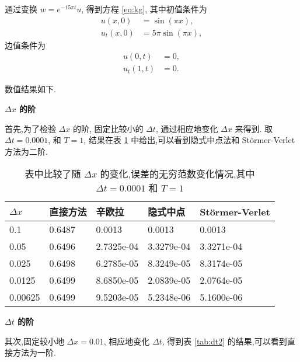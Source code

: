 通过变换 $w=e^{-15\pi t}u$, 得到方程 \eqref{eq:kg}, 其中初值条件为
\begin{equation*}
\begin{aligned}
u(x,0)&=\sin(\pi x),\\
u_t(x,0)&=5\pi \sin(\pi x),
\end{aligned}
\end{equation*}
边值条件为
\begin{equation*}
\begin{aligned}
u(0,t)&=0,\\
u_t(1,t)&=0.
\end{aligned}
\end{equation*}

数值结果如下.

\textbf{$\Delta x$ 的阶}

首先,为了检验 $\Delta x$ 的阶, 固定比较小的 $\Delta
t$, 通过相应地变化 $\Delta x$ 来得到. 取 $\Delta t = 0.0001$, 和 $T
= 1$, 结果在表 \ref{tab:dx2} 中给出,可以看到隐式中点法和 St\"{o}rmer-Verlet 方法为二阶.

\begin{table}[h]
  \centering
\caption{表中比较了随 $\Delta x$ 的变化,误差的无穷范数变化情况,其中 $\Delta t=0.0001$ 和 $T=1$}
\begin{tabularx}{\linewidth}{XXXXX}
 \toprule[1.5pt]
$\Delta x$ &直接方法 & 辛欧拉 & 隐式中点 & St\"{o}rmer-Verlet\\
 \midrule[1pt]
 0.1 & 0.6487 & 0.0013 & 0.0013 & 0.0013\\
 0.05 & 0.6496 & 2.7325e-04 & 3.3279e-04 & 3.3271e-04\\
 0.025 & 0.6498 & 6.2785e-05 & 8.3249e-05 & 8.3174e-05\\
 0.0125 & 0.6499 & 8.6850e-05 & 2.0839e-05 & 2.0764e-05\\
 0.00625 & 0.6499 & 9.5203e-05 & 5.2348e-06 & 5.1600e-06\\
 \bottomrule[1.5pt]
\end{tabularx}
  \label{tab:dx2}
\end{table}

\textbf{$\Delta t$ 的阶}

其次,固定较小地 $\Delta x = 0.01$, 相应地变化 $\Delta t$, 得到表 \ref{tab:dt2} 的结果,可以看到直接方法为一阶.

